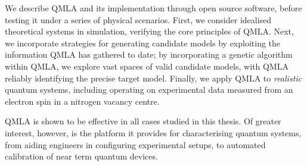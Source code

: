 We describe QMLA and its implementation through open source software,
    before testing it under a series of physical scenarios.
First, we consider idealised theoretical systems in simulation, 
    verifying the core principles of QMLA. 
Next, we incorporate strategies for generating candidate models
    by exploiting the information QMLA has gathered to date;
    by incorporating a genetic algorithm within QMLA, 
    we explore vast spaces of valid candidate models, with QMLA reliably identifying the precise target model.
Finally, we apply QMLA to \emph{realistic} quantum systems, 
    including operating on experimental data measured from an electron spin in a nitrogen vacancy centre. 

\par 

QMLA is shown to be effective in all cases studied in this thesis.
Of greater interest, however, is the platform it provides for characterising quantum systems,
    from aiding engineers in configuring experimental setups, 
    to automated calibration of near term quantum devices. 


